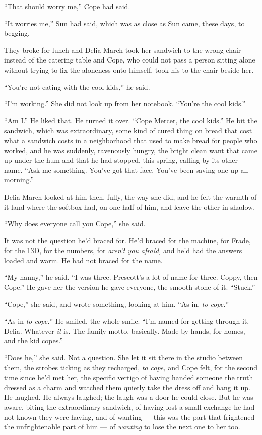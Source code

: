 \documentclass[11pt,openany]{book}
\newcommand{\scenebreak}{\par\vspace{0.5\baselineskip}\begin{center}\textasteriskcentered\quad\textasteriskcentered\quad\textasteriskcentered\end{center}\vspace{0.5\baselineskip}\par}
\begin{document}
``That should worry me,'' Cope had said.

``It worries me,'' Sun had said, which was as close as Sun came, these days, to begging.


\scenebreak


They broke for lunch and Delia March took her sandwich to the wrong chair instead of the catering table and Cope, who could not pass a person sitting alone without trying to fix the aloneness onto himself, took his to the chair beside her.

``You're not eating with the cool kids,'' he said.

``I'm working.'' She did not look up from her notebook. ``You're the cool kids.''

``Am I.'' He liked that. He turned it over. ``Cope Mercer, the cool kids.'' He bit the sandwich, which was extraordinary, some kind of cured thing on bread that cost what a sandwich costs in a neighborhood that used to make bread for people who worked, and he was suddenly, ravenously hungry, the bright clean want that came up under the hum and that he had stopped, this spring, calling by its other name. ``Ask me something. You've got that face. You've been saving one up all morning.''

Delia March looked at him then, fully, the way she did, and he felt the warmth of it land where the softbox had, on one half of him, and leave the other in shadow.

``Why does everyone call you Cope,'' she said.

It was not the question he'd braced for. He'd braced for the machine, for Frade, for the 13D, for the numbers, for \textit{aren't you afraid,} and he'd had the answers loaded and warm. He had not braced for the name.

``My nanny,'' he said. ``I was three. Prescott's a lot of name for three. Coppy, then Cope.'' He gave her the version he gave everyone, the smooth stone of it. ``Stuck.''

``Cope,'' she said, and wrote something, looking at him. ``As in, \textit{to cope.}''

``As in \textit{to cope.}'' He smiled, the whole smile. ``I'm named for getting through it, Delia. Whatever \textit{it} is. The family motto, basically. Made by hands, for homes, and the kid copes.''

``Does he,'' she said. Not a question. She let it sit there in the studio between them, the strobes ticking as they recharged, \textit{to cope,} and Cope felt, for the second time since he'd met her, the specific vertigo of having handed someone the truth dressed as a charm and watched them quietly take the dress off and hang it up. He laughed. He always laughed; the laugh was a door he could close. But he was aware, biting the extraordinary sandwich, of having lost a small exchange he had not known they were having, and of wanting --- this was the part that frightened the unfrightenable part of him --- of \textit{wanting} to lose the next one to her too.
\end{document}
